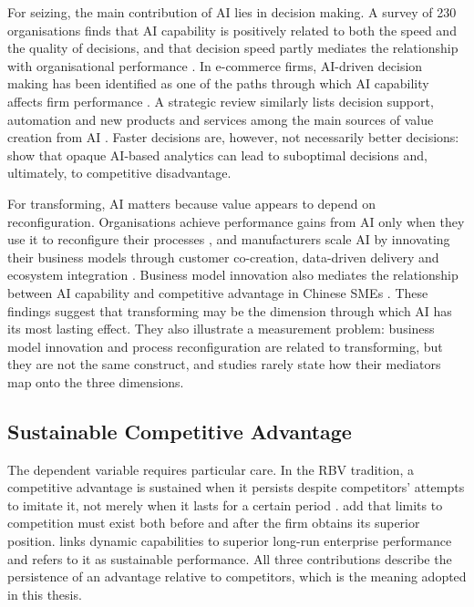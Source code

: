 For seizing, the main contribution of AI lies in decision making. A survey of 230 organisations finds that AI capability is positively related to both the speed and the quality of decisions, and that decision speed partly mediates the relationship with organisational performance \parencite{neiroukh2025}. In e-commerce firms, AI-driven decision making has been identified as one of the paths through which AI capability affects firm performance \parencite{chen2022}. A strategic review similarly lists decision support, automation and new products and services among the main sources of value creation from AI \parencite{borges2021}. Faster decisions are, however, not necessarily better decisions: \textcite{rana2022} show that opaque AI-based analytics can lead to suboptimal decisions and, ultimately, to competitive disadvantage.

For transforming, AI matters because value appears to depend on reconfiguration. Organisations achieve performance gains from AI only when they use it to reconfigure their processes \parencite{wambataguimdje2020}, and manufacturers scale AI by innovating their business models through customer co-creation, data-driven delivery and ecosystem integration \parencite{sjodin2021}. Business model innovation also mediates the relationship between AI capability and competitive advantage in Chinese SMEs \parencite{shao2026}. These findings suggest that transforming may be the dimension through which AI has its most lasting effect. They also illustrate a measurement problem: business model innovation and process reconfiguration are related to transforming, but they are not the same construct, and studies rarely state how their mediators map onto the three dimensions.

\subsection{Sustainable Competitive Advantage}
\label{sec:sca}

The dependent variable requires particular care. In the RBV tradition, a competitive advantage is sustained when it persists despite competitors' attempts to imitate it, not merely when it lasts for a certain period \parencite{barney1991}. \textcite{peteraf1993} add that limits to competition must exist both before and after the firm obtains its superior position. \textcite{teece2007} links dynamic capabilities to superior long-run enterprise performance and refers to it as sustainable performance. All three contributions describe the persistence of an advantage relative to competitors, which is the meaning adopted in this thesis.


